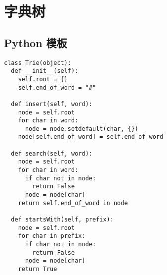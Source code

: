 \newpage
\section{字典树}

\subsection{Python 模板}

\begin{verbatim}
class Trie(object):
  def __init__(self):
    self.root = {}
    self.end_of_word = "#"

  def insert(self, word):
    node = self.root
    for char in word:
      node = node.setdefault(char, {})
    node[self.end_of_word] = self.end_of_word

  def search(self, word):
    node = self.root
    for char in word:
      if char not in node:
        return False
      node = node[char]
    return self.end_of_word in node

  def startsWith(self, prefix):
    node = self.root
    for char in prefix:
      if char not in node:
        return False
      node = node[char]
    return True
\end{verbatim}
